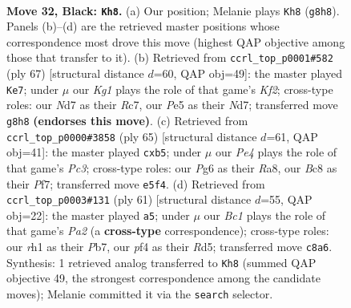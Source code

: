 \documentclass[11pt]{article}
\begin{document}
\clearpage

\begin{figure}[p]\centering
\begin{subfigure}{0.46\textwidth}\centering
\resizebox{\linewidth}{!}{%
\newchessgame
\chessboard[
  setfen={2b3k1/3n1p1p/1r4p1/3Pp3/1p2PP2/1r4P1/5K1P/R5NR b - - 0 32},
  showmover=false,
  pgfstyle=straightmove, color=movearrow, markmove={g8-h8}
]}
\caption{}
\end{subfigure}\hfill
\begin{subfigure}{0.46\textwidth}\centering
\resizebox{\linewidth}{!}{%
\newchessgame
\chessboard[
  setfen={8/1prn1k1p/p3ppp1/6P1/3R1P2/1P1N1K1P/P3P3/8 b - - 0 34},
  showmover=false,
  pgfstyle=straightmove, color=movearrow, markmove={f7-e7}
]}
\caption{}
\end{subfigure}
\\[4pt]
\begin{subfigure}{0.46\textwidth}\centering
\resizebox{\linewidth}{!}{%
\newchessgame
\chessboard[
  setfen={r5k1/5pp1/2p4p/pPBpn3/P7/2P2P1P/6P1/R6K b - - 0 33},
  showmover=false,
  pgfstyle=straightmove, color=movearrow, markmove={c6-b5}
]}
\caption{}
\end{subfigure}\hfill
\begin{subfigure}{0.46\textwidth}\centering
\resizebox{\linewidth}{!}{%
\newchessgame
\chessboard[
  setfen={8/pp2r2p/2n2kp1/2Pr1p2/2R5/1P3NPP/1P2PK2/R7 b - - 0 31},
  showmover=false,
  pgfstyle=straightmove, color=movearrow, markmove={a7-a5}
]}
\caption{}
\end{subfigure}
\caption{\textbf{Move 32, Black: \texttt{Kh8}.} (a) Our position; Melanie plays \texttt{Kh8} (\texttt{g8h8}). Panels (b)--(d) are the retrieved master positions whose correspondence most drove this move (highest QAP objective among those that transfer to it). (b) Retrieved from \texttt{ccrl\_top\_p0001\#582} (ply 67) [structural distance $d$=60, QAP obj=49]: the master played \texttt{Ke7}; under $\mu$ our \emph{Kg1} plays the role of that game's \emph{Kf2}; cross-type roles: our \emph{N}d7 as their \emph{R}c7, our \emph{P}e5 as their \emph{N}d7; transferred move \texttt{g8h8} \textbf{(endorses this move)}. (c) Retrieved from \texttt{ccrl\_top\_p0000\#3858} (ply 65) [structural distance $d$=61, QAP obj=41]: the master played \texttt{cxb5}; under $\mu$ our \emph{Pe4} plays the role of that game's \emph{Pc3}; cross-type roles: our \emph{P}g6 as their \emph{R}a8, our \emph{B}c8 as their \emph{P}f7; transferred move \texttt{e5f4}. (d) Retrieved from \texttt{ccrl\_top\_p0003\#131} (ply 61) [structural distance $d$=55, QAP obj=22]: the master played \texttt{a5}; under $\mu$ our \emph{Bc1} plays the role of that game's \emph{Pa2} (a \textbf{cross-type} correspondence); cross-type roles: our \emph{r}h1 as their \emph{P}b7, our \emph{p}f4 as their \emph{R}d5; transferred move \texttt{c8a6}. Synthesis: 1 retrieved analog transferred to \texttt{Kh8} (summed QAP objective 49, the strongest correspondence among the candidate moves); Melanie committed it via the \texttt{search} selector.}
\label{fig:thought-m63}
\end{figure}
\end{document}
